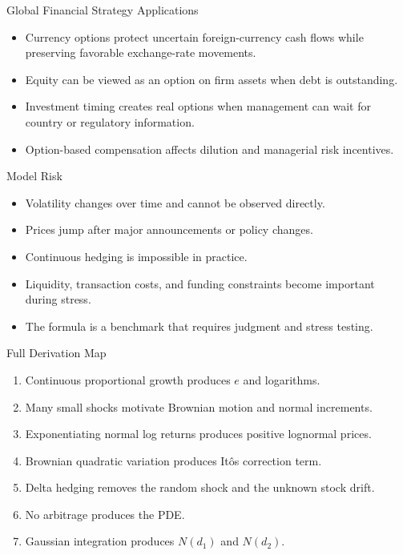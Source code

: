 \documentclass[aspectratio=169]{beamer}
\begin{document}
\begin{frame}[t]{Global Financial Strategy Applications}
\justifying
\begin{itemize}
\item Currency options protect uncertain foreign-currency cash flows while preserving favorable exchange-rate movements.
\item Equity can be viewed as an option on firm assets when debt is outstanding.
\item Investment timing creates real options when management can wait for country or regulatory information.
\item Option-based compensation affects dilution and managerial risk incentives.
\end{itemize}
\end{frame}

\begin{frame}[t]{Model Risk}
\justifying
\begin{itemize}
\item Volatility changes over time and cannot be observed directly.
\item Prices jump after major announcements or policy changes.
\item Continuous hedging is impossible in practice.
\item Liquidity, transaction costs, and funding constraints become important during stress.
\item The formula is a benchmark that requires judgment and stress testing.
\end{itemize}
\end{frame}

\begin{frame}[t]{Full Derivation Map}
\justifying
\begin{enumerate}
\item Continuous proportional growth produces $e$ and logarithms.
\item Many small shocks motivate Brownian motion and normal increments.
\item Exponentiating normal log returns produces positive lognormal prices.
\item Brownian quadratic variation produces It\^o\textquotesingle s correction term.
\item Delta hedging removes the random shock and the unknown stock drift.
\item No arbitrage produces the PDE.
\item Gaussian integration produces $N(d_1)$ and $N(d_2)$.
\end{enumerate}
\end{frame}
\end{document}

